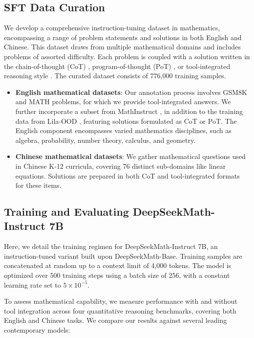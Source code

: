 \subsection{SFT Data Curation}

We develop a comprehensive instruction-tuning dataset in mathematics, encompassing a range of problem statements and solutions in both English and Chinese. This dataset draws from multiple mathematical domains and includes problems of assorted difficulty. Each problem is coupled with a solution written in the chain-of-thought (CoT) \citep{cot}, program-of-thought (PoT) \citep{pot,pal}, or tool-integrated reasoning style \citep{tora}. The curated dataset consists of 776,000 training samples.

\begin{itemize}[topsep=0pt]
    \item \textbf{English mathematical datasets}: Our annotation process involves GSM8K and MATH problems, for which we provide tool-integrated answers. We further incorporate a subset from MathInstruct \citep{MathInstruct}, in addition to the training data from Lila-OOD \citep{lila}, featuring solutions formulated as CoT or PoT. The English component encompasses varied mathematics disciplines, such as algebra, probability, number theory, calculus, and geometry.
    \item \textbf{Chinese mathematical datasets}: We gather mathematical questions used in Chinese K-12 curricula, covering 76 distinct sub-domains like linear equations. Solutions are prepared in both CoT and tool-integrated formats for these items.
\end{itemize}

\subsection{Training and Evaluating DeepSeekMath-Instruct 7B}

Here, we detail the training regimen for DeepSeekMath-Instruct 7B, an instruction-tuned variant built upon DeepSeekMath-Base. Training samples are concatenated at random up to a context limit of 4,000 tokens. The model is optimized over 500 training steps using a batch size of 256, with a constant learning rate set to $5 \times 10^{-5}$.

To assess mathematical capability, we measure performance with and without tool integration across four quantitative reasoning benchmarks, covering both English and Chinese tasks. We compare our results against several leading contemporary models:


